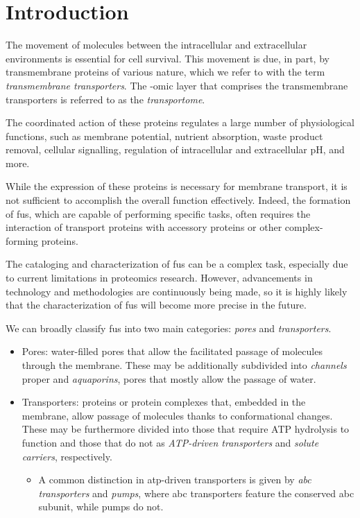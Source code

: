 \section{Introduction}


The movement of molecules between the intracellular and extracellular environments is essential for cell survival.
This movement is due, in part, by transmembrane proteins of various nature, which we refer to with the term \textit{transmembrane transporters}.
The -omic layer that comprises the transmembrane transporters is referred to as the \textit{transportome}.

The coordinated action of these proteins regulates a large number of physiological functions, such as membrane potential, nutrient absorption, waste product removal, cellular signalling, regulation of intracellular and extracellular pH, and more.

While the expression of these proteins is necessary for membrane transport, it is not sufficient to accomplish the overall function effectively.
Indeed, the formation of \glspl{fu}, which are capable of performing specific tasks, often requires the interaction of transport proteins with accessory proteins or other complex-forming proteins.

The cataloging and characterization of \glspl{fu} can be a complex task, especially due to current limitations in proteomics research.
However, advancements in technology and methodologies are continuously being made, so it is highly likely that the characterization of \glspl{fu} will become more precise in the future.

We can broadly classify \glspl{fu} into two main categories: \textit{pores} and \textit{transporters}.
\begin{itemize}
    \item Pores: water-filled pores that allow the facilitated passage of molecules through the membrane.
    These may be additionally subdivided into \textit{channels} proper and \textit{aquaporins}, pores that mostly allow the passage of water.
    \item Transporters: proteins or protein complexes that, embedded in the membrane, allow passage of molecules thanks to conformational changes.
    These may be furthermore divided into those that require ATP hydrolysis to function and those that do not as \textit{ATP-driven transporters} and \textit{solute carriers}, respectively.
    \begin{itemize}
        \item A common distinction in atp-driven transporters is given by \textit{\gls{abc} transporters} and \textit{pumps}, where \gls{abc} transporters feature the conserved \gls{abc} subunit, while pumps do not.
    \end{itemize}
\end{itemize}

